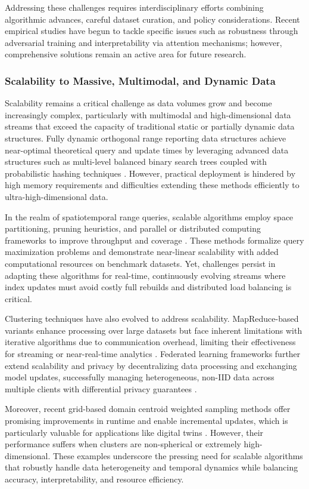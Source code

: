 \documentclass[sigconf]{acmart}
\begin{document}
Addressing these challenges requires interdisciplinary efforts combining algorithmic advances, careful dataset curation, and policy considerations. Recent empirical studies have begun to tackle specific issues such as robustness through adversarial training and interpretability via attention mechanisms; however, comprehensive solutions remain an active area for future research.

\subsubsection{Scalability to Massive, Multimodal, and Dynamic Data}

Scalability remains a critical challenge as data volumes grow and become increasingly complex, particularly with multimodal and high-dimensional data streams that exceed the capacity of traditional static or partially dynamic data structures. Fully dynamic orthogonal range reporting data structures achieve near-optimal theoretical query and update times by leveraging advanced data structures such as multi-level balanced binary search trees coupled with probabilistic hashing techniques \cite{ref3}. However, practical deployment is hindered by high memory requirements and difficulties extending these methods efficiently to ultra-high-dimensional data. 

In the realm of spatiotemporal range queries, scalable algorithms employ space partitioning, pruning heuristics, and parallel or distributed computing frameworks to improve throughput and coverage \cite{ref7}. These methods formalize query maximization problems and demonstrate near-linear scalability with added computational resources on benchmark datasets. Yet, challenges persist in adapting these algorithms for real-time, continuously evolving streams where index updates must avoid costly full rebuilds and distributed load balancing is critical.

Clustering techniques have also evolved to address scalability. MapReduce-based variants enhance processing over large datasets but face inherent limitations with iterative algorithms due to communication overhead, limiting their effectiveness for streaming or near-real-time analytics \cite{ref22}. Federated learning frameworks further extend scalability and privacy by decentralizing data processing and exchanging model updates, successfully managing heterogeneous, non-IID data across multiple clients with differential privacy guarantees \cite{ref22}. 

Moreover, recent grid-based domain centroid weighted sampling methods offer promising improvements in runtime and enable incremental updates, which is particularly valuable for applications like digital twins \cite{ref26}. However, their performance suffers when clusters are non-spherical or extremely high-dimensional. These examples underscore the pressing need for scalable algorithms that robustly handle data heterogeneity and temporal dynamics while balancing accuracy, interpretability, and resource efficiency.
\end{document}
